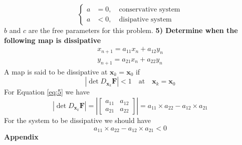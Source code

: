 \documentclass[14pt, a4paper]{extreport}
\begin{document}
%
\begin{equation}
\begin{cases}
	a &= 0, \quad \text{conservative system} \\
	a &< 0, \quad \text{disipative system}
\end{cases}
\end{equation}
%
$b$ and $c$ are the free parameters for this problem.
\newpage
{\flushleft\large{\textbf{5) Determine when the following map is dissipative}}}
%
\begin{equation}\label{eq:5}
\begin{aligned}
	x_{n+1} = a_{11} x_n + a_{12}y_n \\
	y_{n+1} = a_{21} x_n + a_{22}y_n
\end{aligned}
\end{equation}
%
A map is said to be dissipative at $\mathbf{x}_k = \mathbf{x}_0$ if
%
\begin{equation}
	|\det D_{\mathbf{x}_k} \mathbf{F}| < 1 \quad \text{at} \quad \mathbf{x}_k = \mathbf{x}_0
\end{equation}
%
For Equation \eqref{eq:5} we have
%
\begin{equation}
|\det D_{\mathbf{x}_k} \mathbf{F}| = 
\left|
\begin{bmatrix}
a_{11} &a_{12} \\
a_{21} &a_{22}
\end{bmatrix}
\right| = 
a_{11} \times a_{22} - a_{12} \times a_{21}
\end{equation}
%
For the system to be dissipative we should have
%
\begin{equation}
	a_{11} \times a_{22} - a_{12} \times a_{21} < 0
\end{equation}
% 
\newpage
\center\large{\textbf{Appendix}}

\end{document}
